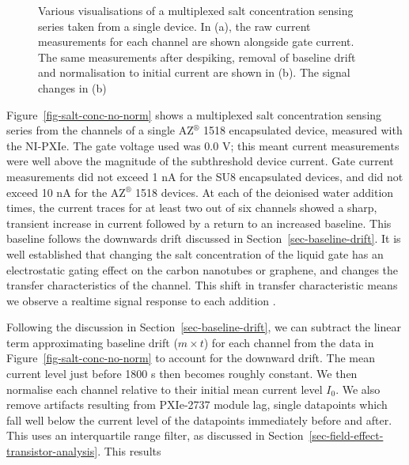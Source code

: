 \documentclass[
  a4paper,
]{scrbook}
\begin{document}
\begin{figure}
\begin{minipage}[t]{0.50\linewidth}
{{}

}

\subcaption{\label{fig-salt-conc-detrend-filter-2}}
\end{minipage}%

\caption{\label{fig-salt-conc-sensing}Various visualisations of a
multiplexed salt concentration sensing series taken from a single
device. In (a), the raw current measurements for each channel are shown
alongside gate current. The same measurements after despiking, removal
of baseline drift and normalisation to initial current are shown in (b).
The signal changes in (b)}

\end{figure}

Figure~\ref{fig-salt-conc-no-norm} shows a multiplexed salt
concentration sensing series from the channels of a single
AZ\(^\circledR\) 1518 encapsulated device, measured with the NI-PXIe.
The gate voltage used was 0.0 V; this meant current measurements were
well above the magnitude of the subthreshold device current. Gate
current measurements did not exceed 1 nA for the SU8 encapsulated
devices, and did not exceed 10 nA for the AZ\(^\circledR\) 1518 devices.
At each of the deionised water addition times, the current traces for at
least two out of six channels showed a sharp, transient increase in
current followed by a return to an increased baseline. This baseline
follows the downwards drift discussed in
Section~\ref{sec-baseline-drift}. It is well established that changing
the salt concentration of the liquid gate has an electrostatic gating
effect on the carbon nanotubes or graphene, and changes the transfer
characteristics of the channel. This shift in transfer characteristic
means we observe a realtime signal response to each addition
\autocite{Heller2009,Heller2010,Kireev2017}.

Following the discussion in Section~\ref{sec-baseline-drift}, we can
subtract the linear term approximating baseline drift (\(m\times t\))
for each channel from the data in Figure~\ref{fig-salt-conc-no-norm} to
account for the downward drift. The mean current level just before 1800
s then becomes roughly constant. We then normalise each channel relative
to their initial mean current level \(I_{0}\). We also remove artifacts
resulting from PXIe-2737 module lag, single datapoints which fall well
below the current level of the datapoints immediately before and after.
This uses an interquartile range filter, as discussed in
Section~\ref{sec-field-effect-transistor-analysis}. This results
\end{document}

